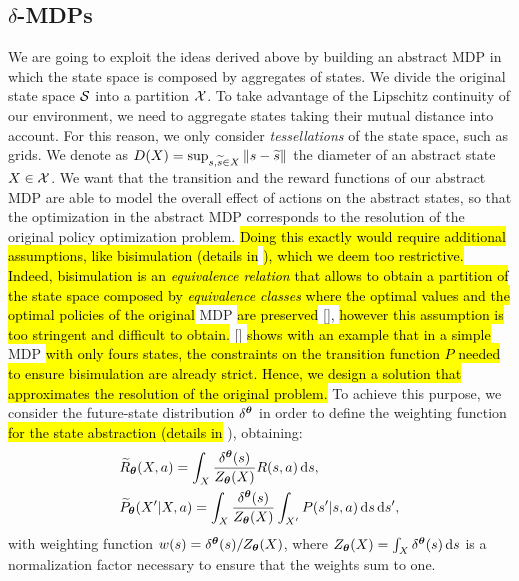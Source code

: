 \subsection{$\delta$-\ac{MDPs}}
We are going to exploit the ideas derived above by building an abstract \ac{MDP} in which the state space is composed by aggregates of states. We divide the original state space $\mathcal{S}$ into a partition $\mathcal{X}$. To take advantage of the Lipschitz continuity of our environment, we need to aggregate states taking their mutual distance into account. For this reason, we only consider \textit{tessellations} of the state space, such as grids. 
%
We denote as $D(X) = \sup_{s,\widetilde{s}\in X}\left\|s-\widetilde{s}\right\|_{}$ the diameter of an abstract state $X\in\mathcal{X}$.
We want that the transition and the reward functions of our abstract \ac{MDP} are able to model the overall effect of actions on the abstract states, so that the optimization in the abstract \ac{MDP} corresponds to the resolution of the original policy optimization problem. \hl{Doing this exactly would require additional assumptions, like bisimulation (details in} \hl{), which we deem too restrictive. Indeed, bisimulation is an \emph{equivalence relation} that allows to obtain a partition of the state space composed by \emph{equivalence classes} where the optimal values and the optimal policies of the original} \ac{MDP} \hl{are preserved} [\cite{givan2003equivalence}], \hl{however this assumption is too stringent and difficult to obtain.} [\cite{ferns2012metrics}] \hl{shows with an example that in a simple} \ac{MDP} \hl{with only fours states, the constraints on the transition function $P$ needed to ensure bisimulation are already strict. Hence, we design a solution that approximates the resolution of the original problem.} To achieve this purpose, we consider the future-state distribution $\delta^{\boldsymbol{\theta}}$ in order to define the weighting function \hl{for the state abstraction (details in} ), obtaining:
%
\begin{align}
	&\widetilde{R}_{\boldsymbol{\theta}}(X,a) = \int_{X}\frac{\delta^{\boldsymbol{\theta}}(s)}{Z_{\boldsymbol{\theta}}(X)}R(s,a)\,\mathrm{d} s,\label{eq:abrew2} \\
	&\widetilde{P}_{\boldsymbol{\theta}}(X'|X,a) = \int_{X} \frac{\delta^{\boldsymbol{\theta}}(s)}{Z_{\boldsymbol{\theta}}(X)} \int_{X'} P(s'|s,a)\,\mathrm{d} s\,\mathrm{d} s',\label{eq:abtran2}
\end{align}
%
\sloppy with weighting function $w(s)=\delta^{\boldsymbol{\theta}}(s)/Z_{\boldsymbol{\theta}}(X)$, where $Z_{\boldsymbol{\theta}}(X)=\int_{X}\delta^{\boldsymbol{\theta}}(s)\,\mathrm{d} s$ is a normalization factor necessary to ensure that the weights sum to one.
